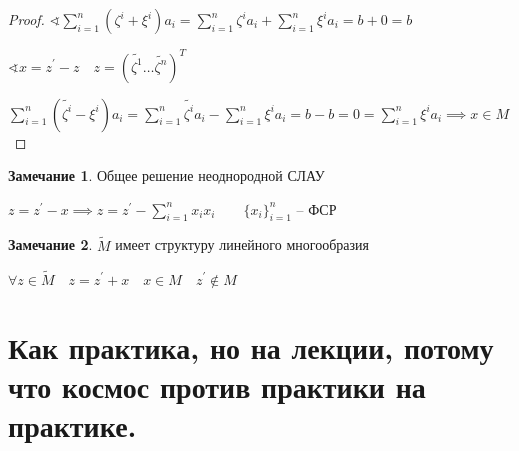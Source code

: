 \documentclass{book}
\newcommand{\p}[1]{#1^{\prime}}
\newcommand{\tl}[1]{\widetilde{#1}}
\theoremstyle{definition}
\newtheorem*{note}{Замечание}
\begin{document}
\begin{enumerate}
\begin{proof}
          $\sphericalangle \sum_{i=1}^{n} \left( \zeta^i+\xi^i \right) a_i = \sum_{i=1}^{n} \zeta^ia_i + \sum_{i=1}^{n} \xi^ia_i = b+0 = b$ 

          $\sphericalangle x = \p z-z\quad z = \left( \tl{\zeta^1} \ldots \tl{\zeta^n} \right)^T$

          $\sum_{i=1}^{n} (\tl{\zeta^i} - \xi^i)a_i = \sum_{i=1}^{n} \tl{\zeta^i}a_i - \sum_{i=1}^{n} \xi^ia_i = b-b = 0 = \sum_{i=1}^{n} \xi^ia_i \implies x\in M$
      \end{proof}

      \begin{note}
          Общее решение неоднородной СЛАУ

          $z = \p z-x \implies z = \p z - \sum_{i=1}^{n} x_ix_i\qquad \{x_i\}_{i=1}^n$ -- ФСР  
      \end{note}
      \begin{note}
          $\tl M$ имеет структуру линейного многообразия

          $\forall z\in \tl M\quad z = \p z+x\quad x\in M\quad \p z\not\in M$
      \end{note}
\end{enumerate}

\section{Как практика, но на лекции, потому что космос против практики на практике.}
\end{document}

